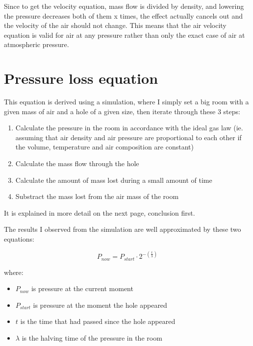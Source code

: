 \documentclass[a4paper]{article}
\begin{document}
	\medskip
	
	Since to get the velocity equation, mass flow is divided by density, and lowering the pressure decreases both of them x times, the effect actually cancels out and the velocity of the air should not change. This means that the air velocity equation is valid for air at any pressure rather than only the exact case of air at atmospheric pressure.
	
	\pagebreak
	
	\section{Pressure loss equation}
	
	This equation is derived using a simulation, where I simply set a big room with a given mass of air and a hole of a given size, then iterate through these 3 steps:
	
	\begin{enumerate}
		\item Calculate the pressure in the room in accordance with the ideal gas law (ie. assuming that air density and air pressure are proportional to each other if the volume, temperature and air composition are constant)
		
		\item Calculate the mass flow through the hole
		
		\item Calculate the amount of mass lost during a small amount of time
		
		\item Substract the mass lost from the air mass of the room
	\end{enumerate}
	
	\noindent It is explained in more detail on the next page, conclusion first.
	
	\bigskip
	
	\bigskip
	    
	The results I observed from the simulation are well approximated by these two equations:
	    
	$$ P_{now} = P_{start} \cdot 2^{-(\frac{t}{\lambda})} $$
		
	where:
	
	\begin{itemize}
		\item $P_{now}$ is pressure at the current moment
		    
		\item $P_{start}$ is pressure at the moment the hole appeared
		
		\item $t$ is the time that had passed since the hole appeared
		
		\item $\lambda$ is the halving time of the pressure in the room
	\end{itemize}
	
\end{document}

